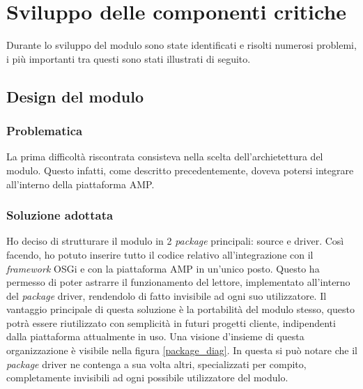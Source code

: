 

\section{Sviluppo delle componenti critiche}
Durante lo sviluppo del modulo sono state identificati e risolti numerosi problemi, i più importanti tra questi sono stati illustrati di seguito.
\subsection{Design del modulo}

\subsubsection*{Problematica}
La prima difficoltà riscontrata consisteva nella scelta dell'archietettura del modulo. Questo infatti, come descritto precedentemente, 
doveva potersi integrare all'interno della piattaforma AMP. 

\subsubsection*{Soluzione adottata}
Ho deciso di strutturare il modulo in 2 \emph{package} principali: source e driver. Così facendo, ho potuto inserire tutto
il codice relativo all'integrazione con il \emph{framework} OSGi e con la piattaforma AMP in un'unico posto.
Questo ha permesso di poter astrarre il funzionamento del lettore, implementato all'interno del \emph{package} driver, rendendolo
di fatto invisibile ad ogni suo utilizzatore. Il vantaggio principale di questa soluzione è la portabilità del modulo stesso, questo
potrà essere riutilizzato con semplicità in futuri progetti cliente, indipendenti dalla piattaforma attualmente in uso.
Una visione d'insieme di questa organizzazione è visibile nella figura \ref{package_diag}. In questa si può notare che il \emph{package}
driver ne contenga a sua volta altri, specializzati per compito, completamente invisibili ad ogni possibile utilizzatore del
modulo.


